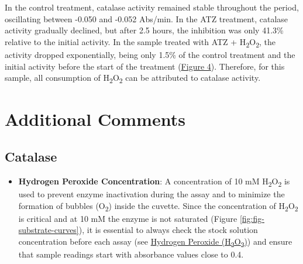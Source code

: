 \documentclass[
  9pt,
  american,
  a5paper,
  extrafontsizes,onecolumn,openright
  ]{memoir}
\providecommand{\tightlist}{%
  \setlength{\itemsep}{0pt}\setlength{\parskip}{0pt}}
\begin{document}
\normalsize

In the control treatment, catalase activity remained stable throughout the period, oscillating between -0.050 and -0.052 Abs/min. In the ATZ treatment, catalase activity gradually declined, but after 2.5 hours, the inhibition was only 41.3\% relative to the initial activity. In the sample treated with ATZ + H\textsubscript{2}O\textsubscript{2}, the activity dropped exponentially, being only 1.5\% of the control treatment and the initial activity before the start of the treatment (\hyperref[fig-inhibitor]{Figure 4}). Therefore, for this sample, all consumption of H\textsubscript{2}O\textsubscript{2} can be attributed to catalase activity.

\section{Additional Comments}\label{cat_additional_comments}



\subsection{Catalase}\label{catalase-1}

\begin{itemize}
\tightlist
\item
  \textbf{Hydrogen Peroxide Concentration}: A concentration of 10 mM H\textsubscript{2}O\textsubscript{2} is used to prevent enzyme inactivation during the assay and to minimize the formation of bubbles (O\textsubscript{2}) inside the cuvette. Since the concentration of H\textsubscript{2}O\textsubscript{2} is critical and at 10 mM the enzyme is not saturated (Figure \ref{fig:fig-substrate-curves}), it is essential to always check the stock solution concentration before each assay (see \hyperref[checking_h2o2]{Hydrogen Peroxide (H\textsubscript{2}O\textsubscript{2})}) and ensure that sample readings start with absorbance values close to 0.4.
\end{itemize}

\scriptsize
\end{document}
